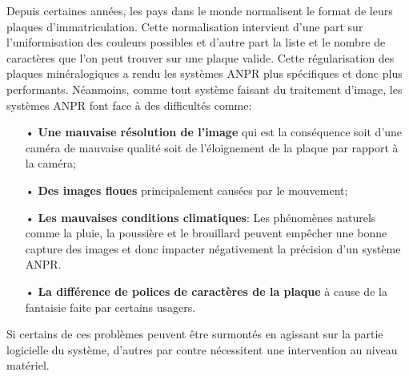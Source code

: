 Depuis certaines années, les pays dans le monde normalisent le format de leurs plaques d’immatriculation. Cette normalisation intervient d’une part sur l’uniformisation des couleurs possibles et d’autre part la liste et le nombre de caractères que l’on peut trouver sur une plaque valide. Cette régularisation des plaques minéralogiques a rendu les systèmes ANPR plus spécifiques et donc plus performants. Néanmoins, comme tout système faisant du traitement d’image, les systèmes ANPR font face à des difficultés comme:
    \begin{itemize}
        \item[•] \textbf{Une mauvaise résolution de l’image} qui est la conséquence soit d’une caméra de mauvaise qualité soit de l’éloignement de la plaque par rapport à la caméra;
        \item[•] \textbf{Des images floues} principalement causées par le mouvement;
        \item[•] \textbf{Les mauvaises conditions climatiques}: Les phénomènes naturels comme la pluie, la poussière et le brouillard peuvent empêcher une bonne capture des images et donc impacter négativement la précision d'un système ANPR.
        \item[•] \textbf{La différence de polices de caractères de la plaque} à cause de la fantaisie faite par certains usagers. \cite{wikianpr}   
    \end{itemize}
Si certains de ces problèmes peuvent être surmontés en agissant sur la partie logicielle du système, d’autres par contre nécessitent une intervention au niveau matériel. 